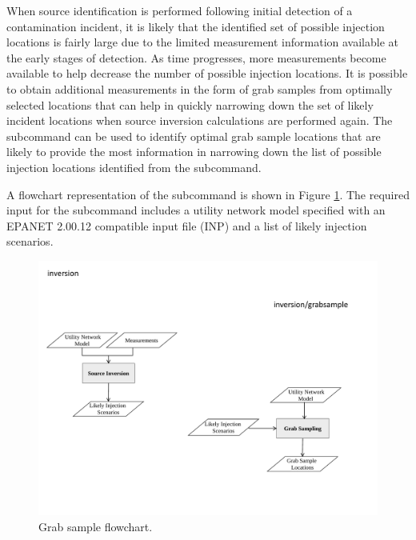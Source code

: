 When source identification is performed following initial detection of a
contamination incident, it is likely that the identified set of
possible injection locations is fairly large due to the limited
measurement information available at the early stages of detection.
As time progresses, more measurements become available to help
decrease the number of possible injection locations. It is possible to
obtain additional measurements in the form of grab samples from
optimally selected locations that can help in quickly narrowing down
the set of likely incident locations when source inversion
calculations are performed again. The  subcommand can be used to
identify optimal grab sample locations 
that are likely to provide the most information in narrowing down the 
list of possible injection locations identified from
the  subcommand.

A flowchart representation of the  subcommand is
shown in Figure \ref{fig:grabsample_flowchart}. The required input
for the  subcommand includes a utility network model
specified with an EPANET 2.00.12 compatible input file (INP) and a list of
likely injection scenarios.


\begin{figure}[h]
  \centering
  \includegraphics[scale=0.75]{graphics/grabsample_flowchart.pdf}
  \caption{Grab sample flowchart.}
  \label{fig:grabsample_flowchart}
\end{figure}

